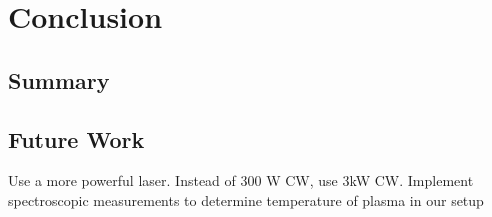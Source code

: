 \chapter{Conclusion}

    \section{Summary}


    \section{Future Work}

        Use a more powerful laser. Instead of 300 W CW, use 3kW CW.
        Implement spectroscopic measurements to determine temperature of plasma in our setup
